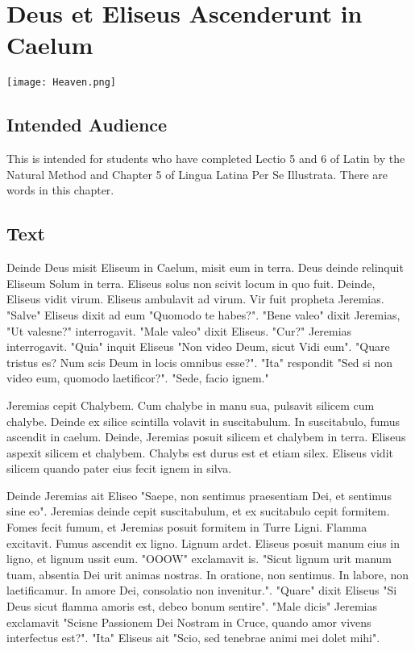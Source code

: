 \chapter{Deus et Eliseus Ascenderunt in Caelum}
\begin{center}
\texttt{[image: Heaven.png]}
\end{center}

\section{Intended Audience}
This is intended for students who have completed Lectio 5 and 6 of Latin by the Natural Method and Chapter 5 of Lingua Latina Per Se Illustrata. There are words in this chapter.

\section{Text}
Deinde Deus misit Eliseum in Caelum, misit eum in terra. Deus deinde relinquit Eliseum Solum in terra. Eliseus solus non scivit locum in quo fuit. Deinde, Eliseus vidit virum. Eliseus ambulavit ad virum. Vir fuit propheta Jeremias. "Salve" Eliseus dixit ad eum "Quomodo te habes?". "Bene valeo" dixit Jeremias, "Ut valesne?" interrogavit. "Male valeo" dixit Eliseus. "Cur?" Jeremias interrogavit. "Quia" inquit Eliseus "Non video Deum, sicut Vidi eum". "Quare tristus es? Num scis Deum in locis omnibus esse?". "Ita" respondit "Sed si non video eum, quomodo laetificor?". "Sede, facio ignem." \par 
Jeremias cepit Chalybem. Cum chalybe in manu sua, pulsavit silicem cum chalybe. Deinde ex silice scintilla volavit in suscitabulum. In suscitabulo, fumus ascendit in caelum. Deinde, Jeremias posuit silicem et chalybem in terra. Eliseus aspexit silicem et chalybem. Chalybs est durus est et etiam silex. Eliseus vidit silicem quando pater eius fecit ignem in silva. \par
Deinde Jeremias ait Eliseo "Saepe, non sentimus praesentiam Dei, et sentimus sine eo". Jeremias deinde cepit suscitabulum, et ex sucitabulo cepit formitem. Fomes fecit fumum, et Jeremias posuit formitem in Turre Ligni. Flamma excitavit. Fumus ascendit ex ligno. Lignum ardet. Eliseus posuit manum eius in ligno, et lignum ussit eum. "OOOW" exclamavit is. "Sicut lignum urit manum tuam, absentia Dei urit animas nostras. In oratione, non sentimus. In labore, non laetificamur. In amore Dei, consolatio non invenitur.". "Quare" dixit Eliseus "Si Deus sicut flamma amoris est, debeo bonum sentire". "Male dicis" Jeremias exclamavit "Scisne Passionem Dei Nostram in Cruce, quando amor vivens interfectus est?". "Ita" Eliseus ait "Scio, sed tenebrae animi mei dolet mihi". \par
